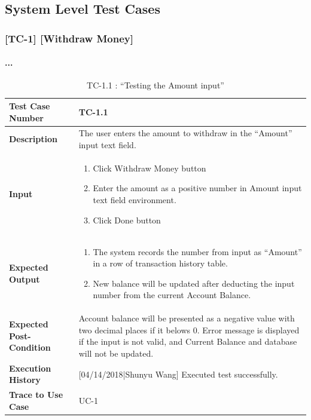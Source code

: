 \documentclass[12pt]{article}
\begin{document}
\subsection{System Level Test Cases}

\subsubsection{[TC-1] [Withdraw Money]} \label{tc:1}
\paragraph{...}
\begin{table}[H]

\caption{ TC-1.1 : “Testing the Amount input”}
\begin{center}
\begin{tabular}{|p{5.5	cm}|p{11cm}|}
\hline
\bf Test Case Number & 
TC-1.1 \\
\hline
\bf Description & 
The user enters the amount to withdraw in the “Amount” input text field.\\
\hline
\bf Input & 
\begin{enumerate}
  \item Click Withdraw Money button
  \item Enter the amount as a positive number in Amount input text field environment.
  \item Click Done button
\end{enumerate} \\
\hline
\bf Expected Output & 
\begin{enumerate}
  \item The system records the number from input as “Amount” in a row of transaction history table.
  \item New balance will be updated after deducting the input number from the current Account Balance.
\end{enumerate} \\
\hline
\bf Expected Post-Condition & 
Account balance will be presented as a negative value with two decimal places if it belows 0. Error message is displayed if the input is not valid, 
and Current Balance and database will not be updated.\\
\hline
\bf Execution History & 
[04/14/2018|Shunyu Wang] Executed test successfully.\\
\hline
\bf Trace to Use Case & 
UC-1\\
\hline

\end{tabular}
\end{center}
\end{table}
\end{document}
